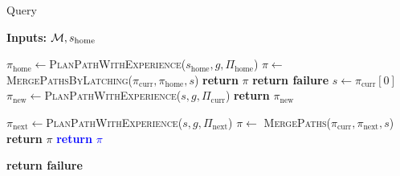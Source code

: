 \documentclass[a4paper]{report}
\begin{document}
\begin{algorithm}[t]
\caption{Query}\label{alg:query}  
    \AlgFontSize
\hspace*{\algorithmicindent} \textbf{Inputs:} $\mathcal{M}, s_{\textrm{home}}$
\begin{algorithmic}[1]
 
            \State $\pi_{\textrm{home}} \leftarrow$\textsc{PlanPathWithExperience}($s_{\textrm{home}},g,\Pi_{\textrm{home}}$)
            \State $\pi \leftarrow$ \textsc{MergePathsByLatching}($\pi_{\textrm{curr}},\pi_{\textrm{home}}, s$)
            \State \textbf{return} $\pi$
            \label{alg:query:line:c3b}
        \EndIf
    \EndIf
\State \textbf{return failure}
\EndProcedure
\vspace{2mm}
    \State $s \leftarrow \pi_{\textrm{curr}}[0]$    
     
        \State $\pi_{\textrm{new}} \leftarrow$\textsc{PlanPathWithExperience}($s,g,\Pi_{\textrm{curr}}$)
        \State \textbf{return} $\pi_{\textrm{new}}$
    \EndIf
     
        \label{alg:query:line:c2a}
         
     
        \State $\pi_{\textrm{next}} \leftarrow$\textsc{PlanPathWithExperience}($s,g,\Pi_{\textrm{next}}$)
        \State $\pi \leftarrow$ \textsc{MergePaths}($\pi_{\textrm{curr}},\pi_{\textrm{next}},s$)
        \State \textbf{return} $\pi$
        \label{alg:query:line:c2b}
    \EndIf
%
%
    \textcolor{blue}{
        \State \textbf{return} $\pi$
    \EndIf
    }

\EndFor
    \State \textbf{return failure} 
\EndProcedure
\end{algorithmic}
\end{algorithm}
\end{document}
